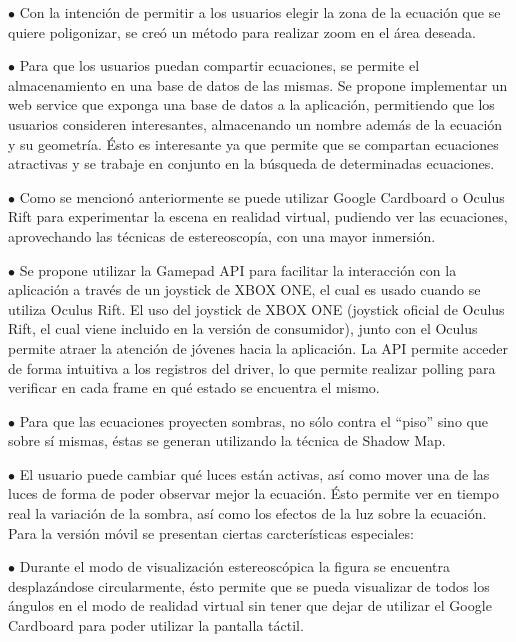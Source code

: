 \documentclass[12pt]{article}
\begin{document}
$\bullet$ Con la intención de permitir a los usuarios elegir la zona de la ecuación que se quiere poligonizar, se creó un método para realizar zoom en el área deseada.  

$\bullet$ Para que los usuarios puedan compartir ecuaciones, se permite el almacenamiento en una base de datos de las mismas. Se propone implementar un web service que exponga una base de datos a la aplicación, permitiendo que los usuarios consideren interesantes, almacenando un nombre además de la ecuación y su geometría. Ésto es interesante ya que permite que se compartan ecuaciones atractivas y se trabaje en conjunto en la búsqueda de determinadas ecuaciones. 

$\bullet$ Como se mencionó anteriormente se puede utilizar Google Cardboard o Oculus Rift para experimentar la escena en realidad virtual, pudiendo ver las ecuaciones, aprovechando las técnicas de estereoscopía, con una mayor inmersión.

$\bullet$ Se propone utilizar la Gamepad API\cite{gamepadapi} para facilitar la interacción con la aplicación a través de un joystick de XBOX ONE, el cual es usado cuando se utiliza Oculus Rift. El uso del joystick de XBOX ONE (joystick oficial de Oculus Rift, el cual viene incluido en la versión de consumidor), junto con el Oculus permite atraer la atención de jóvenes hacia la aplicación. La API permite acceder de forma intuitiva a los registros del driver\cite{engine}, lo que permite realizar polling para verificar en cada frame en qué estado se encuentra el mismo.

$\bullet$ Para que las ecuaciones proyecten sombras, no sólo contra el “piso” sino que sobre sí mismas, éstas se generan utilizando la técnica de Shadow Map\cite{shadowmap}\cite{realtimerendering}.


$\bullet$ El usuario puede cambiar qué luces están activas, así como mover una de las luces de forma de poder observar mejor la ecuación. Ésto permite ver en tiempo real la variación de la sombra, así como los efectos de la luz sobre la ecuación. 
\\

Para la versión móvil se presentan ciertas carcterísticas especiales: 

$\bullet$ Durante el modo de visualización estereoscópica la figura se encuentra desplazándose circularmente, ésto permite que se pueda visualizar de todos los ángulos en el modo de realidad virtual sin tener que dejar de utilizar el Google Cardboard para poder utilizar la pantalla táctil.
\end{document}
